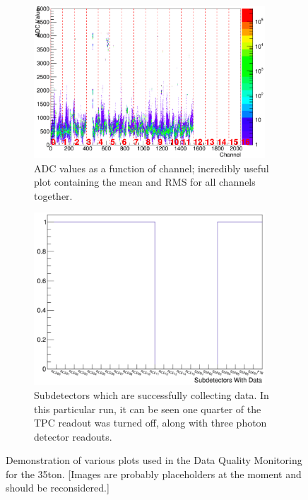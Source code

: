 \begin{figure}[p]
\begin{subfigure}{0.48\linewidth}
    \includegraphics[width=0.95\textwidth]{DQM3.png}
    \caption{ADC values as a function of channel; incredibly useful plot containing the mean and RMS for all channels together.}
    \label{fig:DQMPlot3}
  \end{subfigure}
  \begin{subfigure}{0.48\linewidth}
    \centering
    \includegraphics[width=0.95\textwidth]{DQM4.png}
    \caption{Subdetectors which are successfully collecting data.  In this particular run, it can be seen one quarter of the TPC readout was turned off, along with three photon detector readouts.}
    \label{fig:DQMPlot4}
  \end{subfigure}
  \caption[Selection of Data Quality Monitoring figures]{Demonstration of various plots used in the Data Quality Monitoring for the 35ton. [Images are probably placeholders at the moment and should be reconsidered.]}
  \label{fig:DQMPlots}
\end{figure}

